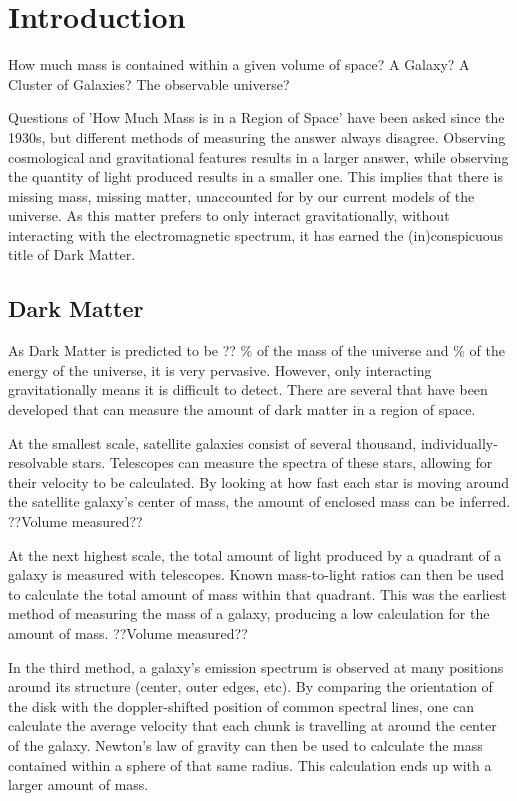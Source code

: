 \cleartooddpage[\thispagestyle{empty}]
\chapter{Introduction}

How much mass is contained within a given volume of space?
A Galaxy?
A Cluster of Galaxies?
The observable universe?

Questions of 'How Much Mass is in a Region of Space' have been asked since the 1930s, but different methods of measuring the answer always disagree.
Observing cosmological and gravitational features results in a larger answer, while observing the quantity of light produced results in a smaller one.
This implies that there is missing mass, missing matter, unaccounted for by our current models of the universe.
As this matter prefers to only interact gravitationally, without interacting with the electromagnetic spectrum, it has earned the (in)conspicuous title of Dark Matter.


\section{Dark Matter}

As Dark Matter is predicted to be ?? \% of the mass of the universe and \% of the energy of the universe, it is very pervasive.
However, only interacting gravitationally means it is difficult to detect.
There are several that have been developed that can measure the amount of dark matter in a region of space.

At the smallest scale, satellite galaxies consist of several thousand, individually-resolvable stars.
Telescopes can measure the spectra of these stars, allowing for their velocity to be calculated.
By looking at how fast each star is moving around the satellite galaxy's center of mass, the amount of enclosed mass can be inferred.
??Volume measured??

At the next highest scale, the total amount of light produced by a quadrant of a galaxy is measured with telescopes.
Known mass-to-light ratios can then be used to calculate the total amount of mass within that quadrant.
This was the earliest method of measuring the mass of a galaxy, producing a low calculation for the amount of mass.
??Volume measured??

In the third method, a galaxy's emission spectrum is observed at many positions around its structure (center, outer edges, etc).
By comparing the orientation of the disk with the doppler-shifted position of common spectral lines, one can calculate the average velocity that each chunk is travelling at around the center of the galaxy.
Newton's law of gravity can then be used to calculate the mass contained within a sphere of that same radius.
This calculation ends up with a larger amount of mass.

